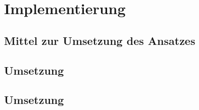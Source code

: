 
\chapter{Implementierung}\label{ch:impl}

\blindtext[1]

\section{Mittel zur Umsetzung des Ansatzes}\label{sec:werkzeug}

\blindtext[1]
\blindenumerate{}
\blindtext[1]

\section{Umsetzung}\label{sec:Umsetzung}

\blindtext[1]

\blindtext[1]

\section{Umsetzung}\label{sec:Probleme}

\blindtext[1]

\blindtext[1]


